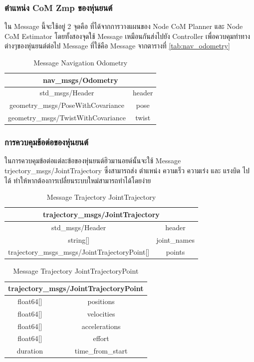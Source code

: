 \subsubsection*{ตำแหน่ง CoM Zmp ของหุ่นยนต์}
ใน Message นี้จะใช้อยู่ 2 จุดคือ ที่ได้จากการวางแผนของ Node CoM Planner และ Node CoM Estimator
โดยทั้งสองจุดใช้ Message เหมือนกันส่งไปยัง Controller เพื่อควบคุมท่าทางต่างๆของหุ่นยนต์ต่อไป
Message ที่ใช้คือ Message จากตารางที่ \ref{tab:nav_odometry}
\begin{table}[h!]
	\centering
	\begin{tabular}{| c | c |}
		\hline
		\multicolumn{2}{|c|}{nav\_msgs/Odometry}\\
		\hline
		std\_msgs/Header & header \\
		geometry\_msgs/PoseWithCovariance & pose \\
		geometry\_msgs/TwistWithCovariance & twist \\
		\hline
	\end{tabular}
	\caption*{Message Navigation Odometry}
\end{table}

\clearpage
\subsubsection*{การควบคุมข้อต่อของหุ่นยนต์}
ในการควบคุมข้อต่อแต่ละข้อของหุ่นยนต์ฮิวมานอยด์นั้นจะใช้ Message trjectory\_msgs/JointTrajectory
ซึ่งสามารถส่ง ตำแหน่ง ความเร็ว ความเร่ง และ แรงบิด ไปได้ ทำให้หากต้องการเปลี่ยนระบบใหม่สามารถทำได้โดยง่าย

\begin{table}[h!]
	\centering
	\begin{tabular}{| c | c |}
		\hline
		\multicolumn{2}{|c|}{trajectory\_msgs/JointTrajectory}\\
		\hline
		std\_msgs/Header & header \\
		string[] & joint\_names \\
		trajectory\_msgs\_msgs/JointTrajectoryPoint[] & points \\
		\hline
	\end{tabular}
	\caption{Message Trajectory JointTrajectory}
	\label{tab:trajectory_jointrajectory}
\end{table}
\begin{table}[h!]
	\centering
	\begin{tabular}{| c | c |}
		\hline
		\multicolumn{2}{|c|}{trajectory\_msgs/JointTrajectoryPoint}\\
		\hline
		float64[] & positions \\
		float64[] & velocities \\
  		float64[] & accelerations \\
  		float64[] & effort \\
  		duration & time\_from\_start \\
		\hline
	\end{tabular}
	\caption{Message Trajectory JointTrajectoryPoint}
	\label{tab:trajectory_jointrajectorypoint}
\end{table}


